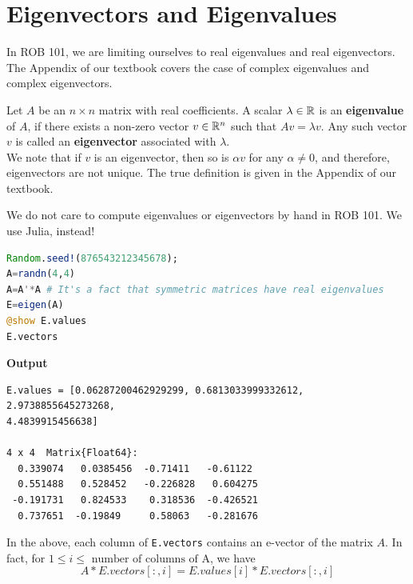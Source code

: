 \Qed

\section{Eigenvectors and Eigenvalues}

In ROB 101, we are limiting ourselves to real eigenvalues and real eigenvectors. The Appendix of our textbook covers the case of complex eigenvalues and complex eigenvectors.

\begin{tcolorbox}[title=\textbf{\Large Eigen Stuff: Incomplete Definition but Good Enough to Get us Started}]
 Let $A$ be an $n\times n$ matrix with real coefficients. A scalar $\lambda \in \mathbb R$ is an \textbf{eigenvalue} of $A$, if there exists a non-zero vector $v \in \mathbb R^{n}$ such that $A  v=\lambda v$.  Any such vector $v$ is called an \textbf{eigenvector} associated with $\lambda$. \\
 
 We note that if $v$ is an eigenvector, then so is $\alpha v$ for any $\alpha \neq 0$, and therefore, eigenvectors are not unique. The true definition is given in the Appendix of our textbook.
\end{tcolorbox}

\begin{tcolorbox}[title=\textbf{\Large Finding Eigenvectors and Eigenvalues with Julia}]
We do not care to compute eigenvalues or eigenvectors by hand in ROB 101. We use Julia, instead!

\begin{lstlisting}[language=Julia,style=mystyle]
Random.seed!(876543212345678);
A=randn(4,4)
A=A'*A # It's a fact that symmetric matrices have real eigenvalues
E=eigen(A)
@show E.values
E.vectors
\end{lstlisting}
\textbf{Output} 
\begin{verbatim}
E.values = [0.06287200462929299, 0.6813033999332612, 2.9738855645273268, 
4.4839915456638]

4 x 4  Matrix{Float64}:
  0.339074   0.0385456  -0.71411   -0.61122
  0.551488   0.528452   -0.226828   0.604275
 -0.191731   0.824533    0.318536  -0.426521
  0.737651  -0.19849     0.58063   -0.281676
\end{verbatim}
\end{tcolorbox}

In the above, each column of \texttt{E.vectors} contains an e-vector of the matrix $A$. In fact, for $1 \le i \le \text{ number of columns of A}$, we have
$$A*E.vectors[:,i] = E.values[i] *  E.vectors[:,i]  $$

